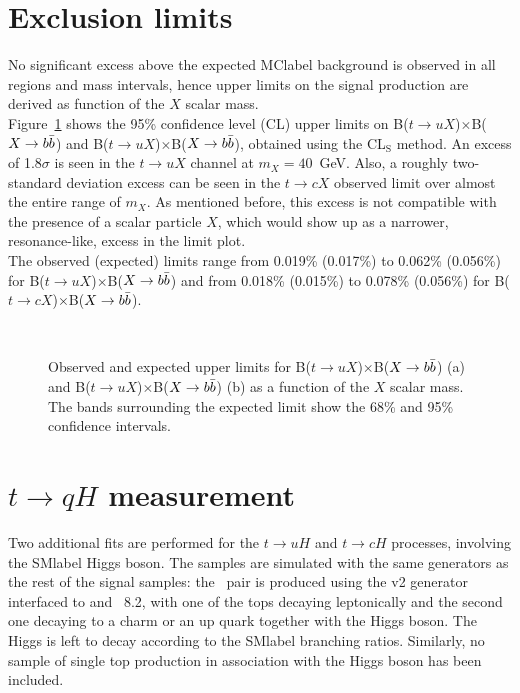 \clearpage

\section{Exclusion limits}

No significant excess above the expected \acrshort{MClabel} background is observed in all regions and mass intervals, hence upper limits on the signal production are derived as function of the $X$ scalar mass.\\

Figure~\ref{tqX:xseclimits} shows the 95\% confidence level (CL) upper limits on B($t\to uX$)$\times$B($X\to b\bar{b}$) and B($t\to uX$)$\times$B($X\to b\bar{b}$), obtained using the CL$_\text{S}$ method. An excess of 1.8$\sigma$ is seen in the $t\to uX$ channel at $m_X=40$~GeV. Also, a roughly two-standard deviation excess can be seen in the $t\to cX$ observed limit over almost the entire range of $m_X$. As mentioned before, this excess is not compatible with the presence of a scalar particle $X$, which would show up as a narrower, resonance-like, excess in the limit plot.\\

The observed (expected) limits range from 0.019\% (0.017\%) to 0.062\% (0.056\%) for B($t\to uX$)$\times$B($X\to b\bar{b}$) and from 0.018\% (0.015\%) to 0.078\% (0.056\%) for B($t\to cX$)$\times$B($X\to b\bar{b}$).\\

\begin{figure}[htb]
    \RawFloats
    \centering
    \\
    \caption{Observed and expected upper limits for B($t\to uX$)$\times$B($X\to b\bar{b}$) (a) and B($t\to uX$)$\times$B($X\to b\bar{b}$) (b) as a function of the $X$ scalar mass. The bands surrounding the expected limit show the 68\% and 95\% confidence intervals.}
    \label{tqX:xseclimits}
\end{figure}

\section{$t\to qH$ measurement}

Two additional fits are performed for the $t\to uH$ and $t\to cH$ processes, involving the \acrshort{SMlabel} Higgs boson. The samples are simulated with the same generators as the rest of the signal samples: the \ttbar\ pair is produced using the \POWHEGBOX v2 generator interfaced to \MADSPIN and \PYTHIA~8.2, with one of the tops decaying leptonically and the second one decaying to a charm or an up quark together with the Higgs boson. The Higgs is left to decay according to the \acrshort{SMlabel} branching ratios. Similarly, no sample of single top production in association with the Higgs boson has been included.\\

